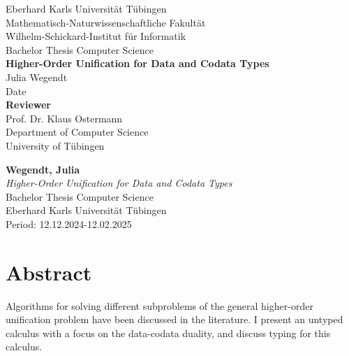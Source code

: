 \documentclass[twoside,12pt,a4paper]{article}
\begin{document}
\begin{titlepage}
 \begin{center}
  {\LARGE Eberhard Karls Universität Tübingen}\\
  {\large Mathematisch-Naturwissenschaftliche Fakultät \\
Wilhelm-Schickard-Institut für Informatik\\[4cm]}
  {\huge Bachelor Thesis Computer Science\\[2cm]}
  {\Large\bf  Higher-Order Unification for Data and Codata Types\\[1.5cm]}
 {\large Julia Wegendt}\\[0.5cm]
Date\\[3cm]
{\small\bf Reviewer}\\[0.5cm]
 {\large Prof. Dr. Klaus Ostermann}\\
  {\footnotesize Department of Computer Science\\
	University of Tübingen}
\end{center}
	
\end{titlepage}

\thispagestyle{empty}
\vspace*{\fill}
\begin{minipage}{11.2cm}
\textbf{Wegendt, Julia}\\
\emph{Higher-Order Unification for Data and Codata Types}\\ Bachelor Thesis Computer Science\\
Eberhard Karls Universität Tübingen\\
Period: 12.12.2024-12.02.2025
\end{minipage}
\newpage


\setcounter{page}{1}


\section*{Abstract}

Algorithms for solving different subproblems of the general higher-order unification problem have been discussed in the literature.
I present an untyped calculus with a focus on the data-codata duality, 
and discuss typing for this calculus.
\end{document}
